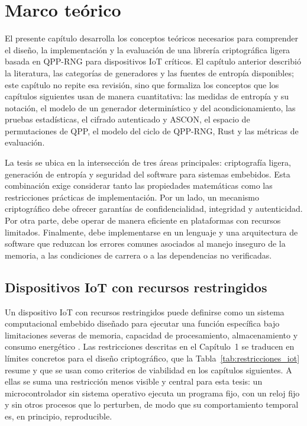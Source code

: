 
\chapter{Marco teórico}

El presente capítulo desarrolla los conceptos teóricos necesarios para comprender el diseño, la implementación y la evaluación de una librería criptográfica ligera basada en QPP-RNG para dispositivos IoT críticos. El capítulo anterior describió la literatura, las categorías de generadores y las fuentes de entropía disponibles; este capítulo no repite esa revisión, sino que formaliza los conceptos que los capítulos siguientes usan de manera cuantitativa: las medidas de entropía y su notación, el modelo de un generador determinístico y del acondicionamiento, las pruebas estadísticas, el cifrado autenticado y ASCON, el espacio de permutaciones de QPP, el modelo del ciclo de QPP-RNG, Rust y las métricas de evaluación.

La tesis se ubica en la intersección de tres áreas principales: criptografía ligera, generación de entropía y seguridad del software para sistemas embebidos. Esta combinación exige considerar tanto las propiedades matemáticas como las restricciones prácticas de implementación. Por un lado, un mecanismo criptográfico debe ofrecer garantías de confidencialidad, integridad y autenticidad. Por otra parte, debe operar de manera eficiente en plataformas con recursos limitados. Finalmente, debe implementarse en un lenguaje y una arquitectura de software que reduzcan los errores comunes asociados al manejo inseguro de la memoria, a las condiciones de carrera o a las dependencias no verificadas.

\section{Dispositivos IoT con recursos restringidos}

Un dispositivo IoT con recursos restringidos puede definirse como un sistema computacional embebido diseñado para ejecutar una función específica bajo limitaciones severas de memoria, capacidad de procesamiento, almacenamiento y consumo energético \cite{Seyhan2022ClassificationTaxonomy,Dhanda2020LightweightIoT}. Las restricciones descritas en el Capítulo~1 se traducen en límites concretos para el diseño criptográfico, que la Tabla~\ref{tab:restricciones_iot} resume y que se usan como criterios de viabilidad en los capítulos siguientes. A ellas se suma una restricción menos visible y central para esta tesis: un microcontrolador sin sistema operativo ejecuta un programa fijo, con un reloj fijo y sin otros procesos que lo perturben, de modo que su comportamiento temporal es, en principio, reproducible.

